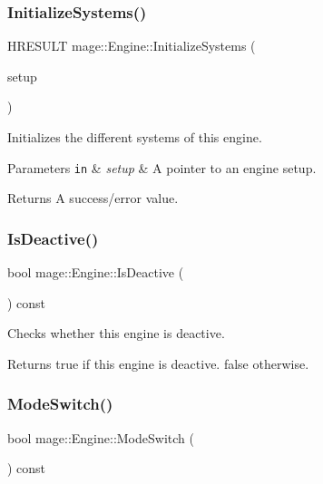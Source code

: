 \subsubsection{\texorpdfstring{Initialize\+Systems()}{InitializeSystems()}}
{\footnotesize\ttfamily H\+R\+E\+S\+U\+LT mage\+::\+Engine\+::\+Initialize\+Systems (\begin{DoxyParamCaption}\item[{const \hyperlink{structmage_1_1_engine_setup}{Engine\+Setup} $\ast$}]{setup }\end{DoxyParamCaption})\hspace{0.3cm}{\ttfamily [protected]}}

Initializes the different systems of this engine.


\begin{DoxyParams}[1]{Parameters}
\mbox{\tt in}  & {\em setup} & A pointer to an engine setup. \\
\hline
\end{DoxyParams}
\begin{DoxyReturn}{Returns}
A success/error value. 
\end{DoxyReturn}
\hypertarget{classmage_1_1_engine_a83c3ed26138932f8b17daa20526b100e}{}\label{classmage_1_1_engine_a83c3ed26138932f8b17daa20526b100e} 
\subsubsection{\texorpdfstring{Is\+Deactive()}{IsDeactive()}}
{\footnotesize\ttfamily bool mage\+::\+Engine\+::\+Is\+Deactive (\begin{DoxyParamCaption}{ }\end{DoxyParamCaption}) const\hspace{0.3cm}{\ttfamily [protected]}}

Checks whether this engine is deactive.

\begin{DoxyReturn}{Returns}
{\ttfamily true} if this engine is deactive. {\ttfamily false} otherwise. 
\end{DoxyReturn}
\hypertarget{classmage_1_1_engine_a54cb08ec26da300b0c7ca4e7f9a35e0b}{}\label{classmage_1_1_engine_a54cb08ec26da300b0c7ca4e7f9a35e0b} 
\subsubsection{\texorpdfstring{Mode\+Switch()}{ModeSwitch()}}
{\footnotesize\ttfamily bool mage\+::\+Engine\+::\+Mode\+Switch (\begin{DoxyParamCaption}{ }\end{DoxyParamCaption}) const\hspace{0.3cm}{\ttfamily [protected]}}

